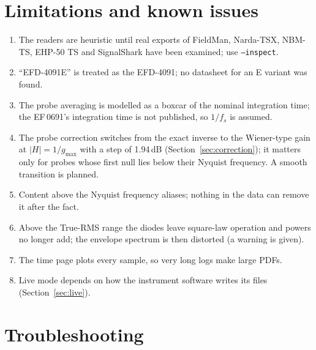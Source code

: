 \documentclass[10pt,letterpaper]{article}
\numberwithin{equation}{section}
\begin{document}
\section{Limitations and known issues}\label{sec:limits}
\begin{enumerate}
\item The readers are heuristic until real exports of FieldMan, Narda-TSX,
NBM-TS, EHP-50 TS and SignalShark have been examined; use \texttt{--inspect}.
\item ``EFD-4091E'' is treated as the EFD-4091; no datasheet for an E variant
was found.
\item The probe averaging is modelled as a boxcar of the nominal integration
time; the EF\,0691's integration time is not published, so $1/f_s$ is assumed.
\item The probe correction switches from the exact inverse to the Wiener-type
gain at $|H| = 1/g_\mathrm{max}$ with a step of 1.94\,dB
(Section~\ref{sec:correction}); it matters only for probes whose first null lies
below their Nyquist frequency. A smooth transition is planned.
\item Content above the Nyquist frequency aliases; nothing in the data can
remove it after the fact.
\item Above the True-RMS range the diodes leave square-law operation and powers
no longer add; the envelope spectrum is then distorted (a warning is given).
\item The time page plots every sample, so very long logs make large PDFs.
\item Live mode depends on how the instrument software writes its files
(Section~\ref{sec:live}).
\end{enumerate}

\section{Troubleshooting}\label{sec:troubleshooting}
\end{document}

